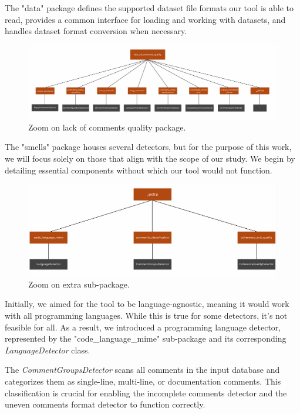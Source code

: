 \noindent The "data" package defines the supported dataset file formats our tool is able to read, provides a common interface for loading and working with datasets, and handles dataset format conversion when necessary.

\newpage
	
\begin{figure}[ht]
	\centering\includegraphics[width=465pt]{figs/zoom-cmsquality.PNG}
	\captionsetup{justification=centering}
	\caption{Zoom on lack of comments quality package.}
	\label{fig:zoom-cmsquality}
\end{figure}
	
\noindent The "smells" package houses several detectors, but for the purpose of this work, we will focus solely on those that align with the scope of our study. We begin by detailing essential components without which our tool would not function.

\begin{figure}[ht]
	\centering\includegraphics[width=400pt]{figs/zoom-extra.PNG}
	\captionsetup{justification=centering}
	\caption{Zoom on extra sub-package.}
	\label{fig:zoom-extra}
\end{figure}

\noindent Initially, we aimed for the tool to be language-agnostic, meaning it would work with all programming languages. While this is true for some detectors, it’s not feasible for all. As a result, we introduced a programming language detector, represented by the "code\_language\_mime" sub-package and its corresponding \textit{LanguageDetector} class.

\noindent The \textit{CommentGroupsDetector} scans all comments in the input database and categorizes them as single-line, multi-line, or documentation comments. This classification is crucial for enabling the incomplete comments detector and the uneven comments format detector to function correctly.

